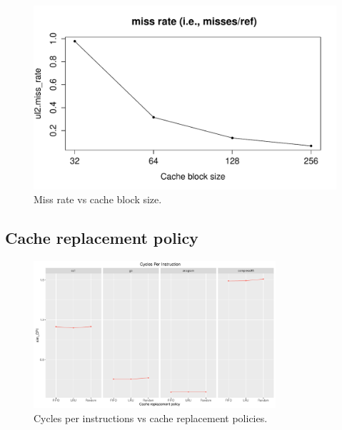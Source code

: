 \documentclass[10pt]{scrartcl}
\begin{document}
\begin{figure}[!htb]
\endminipage
{}%
  \includegraphics[trim={1cm 1.2cm 0 1.8cm},clip,width=\linewidth]{NewPlots/plot_BS_G_miss-rate}
\endminipage
\caption{Miss rate vs cache block size.}\label{fig:cache-bs_miss_rate}
\end{figure}

\FloatBarrier

\subsection{Cache replacement policy}

\begin{figure}[h]
  \centering
  \includegraphics[width=0.8\textwidth]{Plots/plot_CacheRP_sim_CPI}
  \caption{Cycles per instructions vs cache replacement policies.}\label{fig:cache-rp_sim_cpi}
\end{figure}
\end{document}
